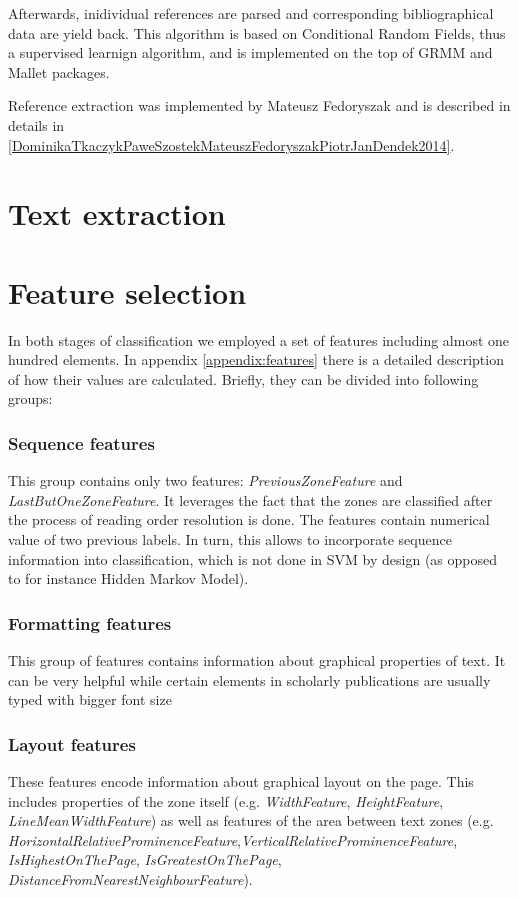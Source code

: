 Afterwards, inidividual references are parsed and corresponding bibliographical data are yield back. This algorithm is based on Conditional Random Fields, thus a supervised learnign algorithm, and is implemented on the top of GRMM and Mallet packages.

Reference extraction was implemented by Mateusz Fedoryszak and is described in details in \ref{DominikaTkaczykPaweSzostekMateuszFedoryszakPiotrJanDendek2014}.
\section{Text extraction}
\section{Feature selection}
In both stages of classification we employed a set of features including almost one hundred elements. In appendix \ref{appendix:features} there is a detailed description of how their values are calculated. Briefly, they can be divided into following groups:
\subsubsection{Sequence features}
This group contains only two features: \textit{PreviousZoneFeature} and \textit{LastButOneZoneFeature}. It leverages the fact that the zones are classified after the process of reading order resolution is done. The features contain numerical value of two previous labels. In turn, this allows to incorporate sequence information into classification, which is not done in SVM by design (as opposed to for instance Hidden Markov Model).
\subsubsection{Formatting features}
This group of features contains information about graphical properties of text. It can be very helpful while certain elements in scholarly publications are usually typed with bigger font size
\subsubsection{Layout features}
These features encode information about graphical layout on the page. This includes properties of the zone itself (e.g. \textit{WidthFeature}, \textit{HeightFeature}, \textit{LineMeanWidthFeature}) as well as features of the area between text zones (e.g. \textit{HorizontalRelativeProminenceFeature},\textit{VerticalRelativeProminenceFeature}, \textit{IsHighestOnThePage}, \textit{IsGreatestOnThePage}, \textit{DistanceFromNearestNeighbourFeature}). 
